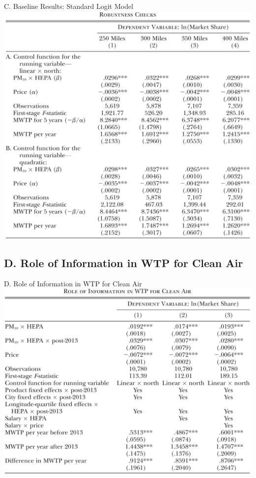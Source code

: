 \documentclass{beamer}
\begin{document}
\begin{frame}{C. Baseline Results: Standard Logit Model}
	\centering
	\includegraphics[scale=0.35]{table5.png}
\end{frame}
\subsection{D. Role of Information in WTP for Clean Air}
\begin{frame}[shrink]
	\transfade
	\tableofcontents[sectionstyle=show/shaded,subsectionstyle=show/shaded/hide]
	\addtocounter{framenumber}{-1}
\end{frame}
\begin{frame}{D. Role of Information in WTP for Clean Air}
	\centering
	\includegraphics[scale=0.35]{table6.png}	
\end{frame}
\end{document}
